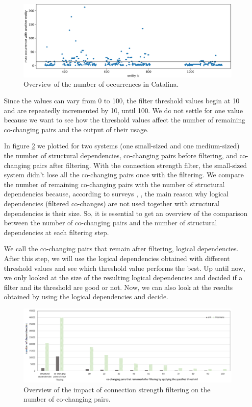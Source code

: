 \documentclass[runningheads]{comsis2}
\begin{document}
\begin{figure}
\centering
\includegraphics[width=\textwidth]{fig_catalina_maxOcc.png}
\caption{Overview of the number of occurrences in Catalina. }
\label{fig:strength_overview_catalina}
\centering
\end{figure}


Since the values can vary from 0 to 100, the filter threshold values begin at 10 and are repeatedly incremented by 10, until 100. We do not settle for one value because we want to see how the threshold values affect the number of remaining co-changing pairs and the output of their usage.

In figure \ref{fig:strength_overview} we plotted for two systems (one small-sized and one medium-sized) the number of structural dependencies, co-changing pairs before filtering, and co-changing pairs after filtering. With the connection strength filter, the small-sized system didn't lose all the co-changing pairs once with the filtering.
We compare the number of remaining co-changing pairs with the number of structural dependencies because, according to surveys \cite{Shtern:2012:CMS:2332427.2332428}, \cite{sar}, the main reason why logical dependencies (filtered co-changes) are not used together with structural dependencies is their size. So, it is essential to get an overview of the comparison between the number of co-changing pairs and the number of structural dependencies at each filtering step.

We call the co-changing pairs that remain after filtering, logical dependencies. 
After this step, we will use the logical dependencies obtained with different threshold values and see which threshold value performs the best. Up until now, we only looked at the size of the resulting logical dependencies and decided if a filter and its threshold are good or not. Now, we can also look at the results obtained by using the logical dependencies and decide.

\begin{figure}
\centering
\includegraphics[width=\textwidth]{strength_overview.PNG}
\caption{Overview of the impact of connection strength filtering on the number of co-changing pairs. }
\label{fig:strength_overview}
\centering
\end{figure}
\end{document}
